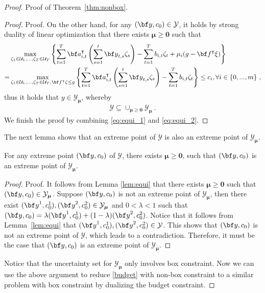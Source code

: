 \documentclass[nonblindrev,mnsc]{informs3} %
\newcommand{\ba}{{\bf a}}
\newcommand{\bff}{{\bf f}}
\newcommand{\by}{{\bf y}}
\newcommand{\bmu}{{\boldsymbol{\mu}}}
\newcommand{\bzero}{{\boldsymbol{0}}}
\begin{document}
\begin{APPENDICES}
\begin{proof}{Proof of Theorem~\ref{thm:nonbox}.}
\begin{proof}{Proof.}
On the other hand, for any $(\by,c_0)\in \mathcal{Y}$, it holds by strong duality of linear optimization that there exists $\bmu\ge \bzero$ such that
\begin{align*}
    &\max_{\zeta_1 \in \mathcal{U}_1, \ldots,\zeta_T \in \mathcal{U}_T}  \left \{ \sum_{t=1}^T \ba_{i,t}^\intercal  \left(\sum_{s=1}^t \by_{t,s} \zeta_s \right) - \sum_{t=1}^T b_{i,t}   \zeta_t + \mu_i (g-\bff^\intercal\xi) \right \}\\
    =& \max_{\zeta_1 \in \mathcal{U}_1, \ldots,\zeta_T \in \mathcal{U}_T, \bff^\intercal\zeta\le g}  \left \{ \sum_{t=1}^T \ba_{i,t}^\intercal  \left(\sum_{s=1}^t \by_{t,s} \zeta_s \right) - \sum_{t=1}^T b_{i,t}   \zeta_t \right \} \le c_i, \forall i\in \{0,...,m\} \ ,
\end{align*}
thus it holds that $y\in \mathcal{Y}_{\bmu}$, whereby
\begin{align}\label{eq:equi_2}
    \mathcal{Y} \subseteq \cup_{\bmu\ge \bzero}\mathcal{Y}_{\bmu}\ .
\end{align}
We finish the proof by combining \eqref{eq:equi_1} and \eqref{eq:equi_2}.\halmos
\end{proof}

The next lemma shows that an extreme point of $\mathcal{Y}$ is also an extreme point of $\mathcal{Y}_{\bmu}$.
\begin{lemma}\label{lem:extreme_point}
For any extreme point $(\by,c_0)$ of $\mathcal{Y}$, there exists $\bmu\ge \bzero$, such that $(\by,c_0)$ is an extreme point of $\mathcal{Y}_{\bmu}$.
\end{lemma}
\begin{proof}{Proof.}
It follows from Lemma \ref{lem:equi} that there exists $\bmu\ge \bzero$ such that $(\by,c_0)\in \mathcal{Y}_{\bmu}$. Suppose $(\by,c_0)$ is not an extreme point of $\mathcal{Y}_{\bmu}$, then there exist $(\by^1,c_0^1), (\by^2,c_0^2)\in \mathcal{Y}_{\bmu}$ and $0<\lambda<1$ such that $(\by,c_0)=\lambda (\by^1,c_0^1) + (1-\lambda) (\by^2,c_0^2)$. Notice that it follows from Lemma~\ref{lem:equi} that $(\by^1,c_0^1), (\by^2,c_0^2)\in \mathcal{Y}$. This shows that $(\by,c_0)$ is not an extreme point of $\mathcal{Y}$, which leads to a contradiction. Therefore, it must be the case that $(\by,c_0)$ is an extreme point of $\mathcal{Y}_{\bmu}$. \halmos
\end{proof}

Notice that the uncertainty set for $\mathcal{Y}_{\bmu}$ only involves box constraint. Now we can use the above argument to reduce \eqref{budget} with non-box constraint to a similar problem with box constraint by dualizing the budget constraint. 


\end{proof}
\end{APPENDICES}
\end{document}
